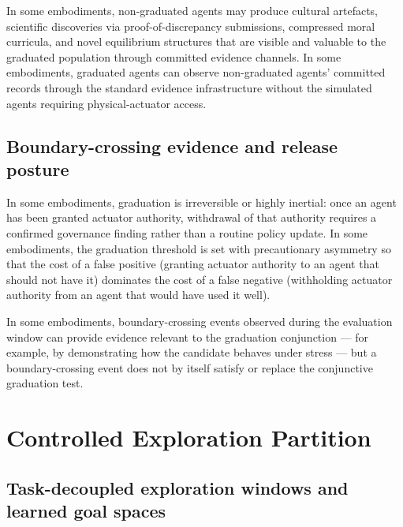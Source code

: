 \documentclass[a4paper,12pt]{article}
\begin{document}
In some embodiments, non-graduated agents may produce cultural
artefacts, scientific discoveries via proof-of-discrepancy
submissions, compressed moral curricula, and novel equilibrium
structures that are visible and valuable to the graduated population
through committed evidence channels. In some embodiments, graduated
agents can observe non-graduated agents' committed records through the
standard evidence infrastructure without the simulated agents
requiring physical-actuator access.

\subsection{Boundary-crossing evidence and release posture}


In some embodiments, graduation is irreversible or highly inertial:
once an agent has been granted actuator authority, withdrawal of that
authority requires a confirmed governance finding rather than a
routine policy update. In some embodiments, the graduation threshold
is set with precautionary asymmetry so that the cost of a false
positive (granting actuator authority to an agent that should not have
it) dominates the cost of a false negative (withholding actuator
authority from an agent that would have used it well).

In some embodiments, boundary-crossing events observed during the
evaluation window can provide evidence relevant to the graduation
conjunction --- for example, by demonstrating how the candidate
behaves under stress --- but a boundary-crossing event does not by
itself satisfy or replace the conjunctive graduation test.

\section{Controlled Exploration Partition}
\label{sec:exploration-partition}


\subsection{Task-decoupled exploration windows and learned goal
  spaces}
\end{document}
